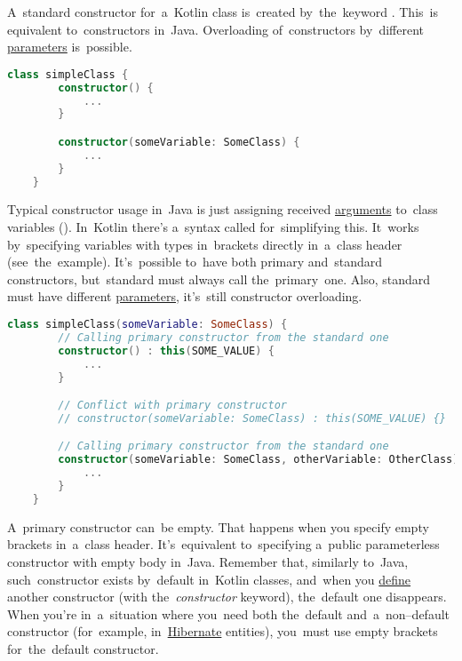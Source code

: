 \label{kotlin}

\label{kotlinconstructor}
A~standard constructor for~a~Kotlin class is~created by~the~keyword .
This~is equivalent to~constructors in~Java.
Overloading of~constructors by~different \hyperref[parameterargument]{parameters} is~possible.

\begin{lstlisting}[language=Kotlin]
    class simpleClass {
        constructor() {
            ...
        }

        constructor(someVariable: SomeClass) {
            ...
        }
    }
\end{lstlisting}

\label{kotlinprimaryconstructor}
Typical constructor usage in~Java is just assigning received \hyperref[parameterargument]{arguments} to~class variables ().
In~Kotlin there's a~syntax called  for~simplifying this.
It~works by~specifying variables with types in~brackets directly in~a~class header (see~the~example).
It's~possible to~have both primary and~standard constructors, but~standard must always call the~primary~one.
Also, standard must have different \hyperref[parameterargument]{parameters}, it's~still constructor overloading.
\newpage

\begin{lstlisting}[language=Kotlin]
    class simpleClass(someVariable: SomeClass) {
        // Calling primary constructor from the standard one
        constructor() : this(SOME_VALUE) {
            ...
        }

        // Conflict with primary constructor
        // constructor(someVariable: SomeClass) : this(SOME_VALUE) {}

        // Calling primary constructor from the standard one
        constructor(someVariable: SomeClass, otherVariable: OtherClass) : this(SOME_VALUE) {
            ...
        }
    }
\end{lstlisting}

\noindent A~primary constructor can~be empty.
That happens when you specify empty brackets in~a~class header.
It's~equivalent to~specifying a~public parameterless constructor with empty body in~Java.
Remember that, similarly to~Java, such~constructor exists by~default in~Kotlin classes, and~when you \hyperref[declarationdefinition]{define} another constructor (with the~\textit{constructor} keyword), the~default one disappears.
When you're in~a~situation where you~need both the~default and~a~non--default constructor (for~example, in~\hyperref[hibernate]{Hibernate} entities), you~must use empty brackets for~the~default constructor.

